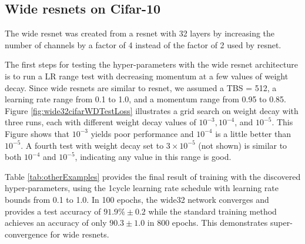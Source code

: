 \documentclass{article} %
\begin{document}
\subsection{Wide resnets on Cifar-10}
\label{sec:wide}

The wide resnet was created from a resnet with 32 layers by increasing the number of channels by a factor of 4 instead of the factor of 2 used by resnet.  

The first steps for testing the hyper-parameters with the wide resnet architecture is to run a LR range test with decreasing momentum at a few values of weight decay.  Since wide resnets are similar to resnet, we assumed a TBS = 512, a learning rate range from 0.1 to 1.0, and a momentum range from 0.95 to 0.85.  Figure \ref{fig:wide32cifarWDTestLoss} illustrates a grid search on weight decay with three runs, each with different weight decay values of $10^{-3}, 10^{-4}$, and $10^{-5}$.  This Figure shows that $10^{-3}$ yields poor performance and $10^{-4}$ is a little better than $10^{-5}$.  A fourth test with weight decay set to $3 \times 10^{-5}$ (not shown) is similar to both $10^{-4}$ and $10^{-5}$, indicating any value in this range is good.

Table \ref{tab:otherExamples} provides the final result of training with the discovered hyper-parameters, using the 1cycle learning rate schedule with learning rate bounds from 0.1 to 1.0.  In 100 epochs, the wide32 network converges and provides a test accuracy of $91.9\% \pm 0.2$ while the standard training method achieves an accuracy of only $ 90.3 \pm 1.0 $ in 800 epochs.  This demonstrates super-convergence for wide resnets.
\end{document}
